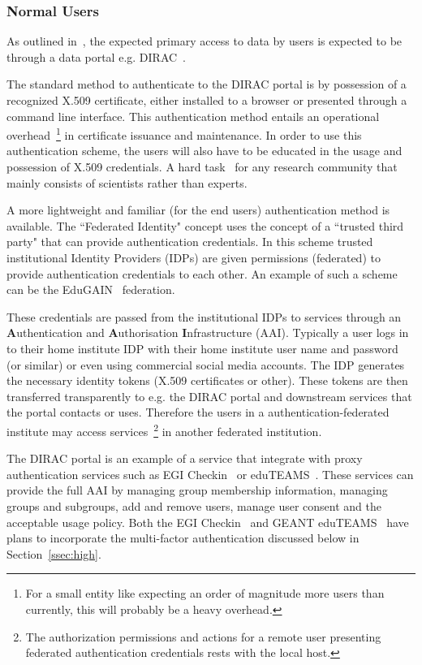 \documentclass[12pt,a4paper]{article}
\begin{document}
\subsubsection{Normal Users}
\label{ssec:normal}

As outlined in~\cite{e3ds-md3}, the expected primary access to \ED data by users is expected to be through a data portal e.g. DIRAC~\cite{dirac}.

The standard method to authenticate to the DIRAC portal is by possession of a recognized X.509 certificate, either installed to a browser or presented through a command line interface.
This authentication method entails an operational overhead~\footnote{For a small entity like \EC expecting an order of magnitude more users than currently, this will probably be a heavy overhead.} in certificate issuance and maintenance.
In order to use this authentication scheme, the \ED users will also have to be educated in the usage and possession of X.509 credentials.
A hard task~\cite{cert-example} for any research community that mainly consists of scientists rather than \einfra experts.

A more lightweight and familiar (for the end users) authentication method is available.
The ``Federated Identity" concept uses the concept of a ``trusted third party" that can provide authentication credentials.
In this scheme trusted institutional Identity Providers (IDPs) are given permissions (federated) to provide authentication credentials to each other. 
An example of such a scheme can be the EduGAIN~\cite{edugain} federation.

These credentials are passed from the institutional IDPs to services 
through an {\bf A}uthentication and {\bf A}uthorisation {\bf I}nfrastructure (AAI).
Typically a user logs in to their home institute IDP with their home institute user name and password (or similar) or even using commercial social media accounts.
The IDP generates the necessary identity tokens (X.509 certificates or other).  
These tokens are then transferred transparently to e.g. the DIRAC portal and downstream services that the portal contacts or uses.
Therefore the users in a authentication-federated institute may access services~\footnote{The authorization permissions and actions for a remote user presenting federated authentication credentials rests with the local host.} in another federated institution.

The DIRAC portal is an example of a service that integrate with proxy authentication services such as EGI Checkin~\cite{egi-checkin} or eduTEAMS~\cite{eduteams}.
These services can provide the full AAI by managing group membership information, managing groups and subgroups, add and remove users, manage user consent and the acceptable usage policy.
Both the EGI Checkin~\cite{egi-checkin} and GEANT eduTEAMS~\cite{eduteams} have plans to incorporate the multi-factor authentication discussed below in Section~\ref{ssec:high}.
\end{document}
